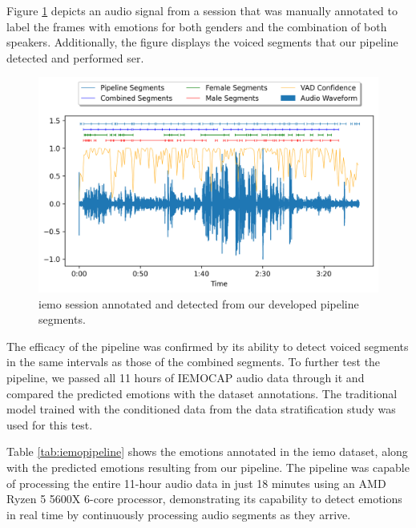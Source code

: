 Figure \ref{fig:iemo_pipeline} depicts an audio signal from a session that was manually annotated to label the frames with emotions for both genders and the combination of both speakers. Additionally, the figure displays the voiced segments that our pipeline detected and performed \ac{ser}.

\begin{figure}[H]
	\centering
	\includegraphics[width=\textwidth]{figs/6_video_conf_ser/pipeline.png}
	\caption{\ac{iemo} session annotated and detected from our developed pipeline segments.}
	\label{fig:iemo_pipeline}
\end{figure}

The efficacy of the pipeline was confirmed by its ability to detect voiced segments in the same intervals as those of the combined segments. To further test the pipeline, we passed all 11 hours of IEMOCAP audio data through it and compared the predicted emotions with the dataset annotations. The traditional model trained with the conditioned data from the data stratification study was used for this test.

Table \ref{tab:iemopipeline} shows the emotions annotated in the \ac{iemo} dataset, along with the predicted emotions resulting from our pipeline. The pipeline was capable of processing the entire 11-hour audio data in just 18 minutes using an AMD Ryzen 5 5600X 6-core processor, demonstrating its capability to detect emotions in real time by continuously processing audio segments as they arrive.

